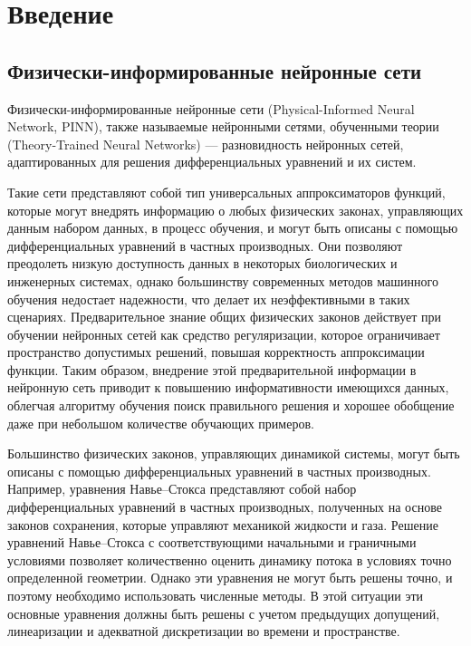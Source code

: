 \chapter{Введение}

\section{Физически-информированные нейронные сети}
Физически-информированные нейронные сети (Physical-Informed Neural Network, PINN), 
также называемые нейронными сетями, обученными теории (Theory-Trained Neural Networks)
--- разновидность нейронных сетей, адаптированных для решения дифференциальных
уравнений и их систем.


Такие сети представляют собой тип универсальных аппроксиматоров функций, которые могут внедрять информацию
о любых физических законах, управляющих данным набором данных, в процесс обучения, 
и могут быть описаны с помощью дифференциальных уравнений в частных производных. 
Они позволяют преодолеть низкую доступность данных в некоторых биологических и инженерных системах, 
однако большинству современных методов машинного обучения недостает надежности,
что делает их неэффективными в таких сценариях. Предварительное знание общих физических законов 
действует при обучении нейронных сетей как средство регуляризации, которое ограничивает 
пространство допустимых решений, повышая корректность аппроксимации функции. Таким образом, 
внедрение этой предварительной информации в нейронную сеть приводит к повышению информативности
имеющихся данных, облегчая алгоритму обучения поиск правильного решения и хорошее обобщение
даже при небольшом количестве обучающих примеров.

Большинство физических законов, управляющих динамикой системы, могут быть описаны с помощью
дифференциальных уравнений в частных производных. Например, уравнения Навье–Стокса представляют 
собой набор дифференциальных уравнений в частных производных, полученных на основе законов сохранения,
которые управляют механикой жидкости и газа. Решение уравнений Навье–Стокса с соответствующими начальными
и граничными условиями позволяет количественно оценить динамику потока в условиях точно определенной геометрии.
Однако эти уравнения не могут быть решены точно, и поэтому необходимо использовать численные методы.
В этой ситуации эти основные уравнения должны быть решены с учетом предыдущих допущений, линеаризации и адекватной
дискретизации во времени и пространстве.


